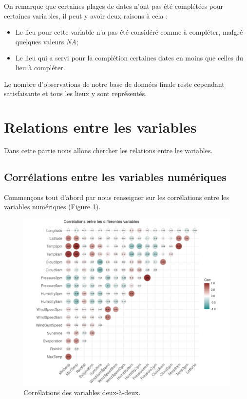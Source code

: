 \documentclass{article}
\begin{document}
On remarque que certaines plages de dates n'ont pas été complétées pour certaines variables, il peut y avoir deux raisons à cela : 
\begin{itemize}
    \item Le lieu pour cette variable n'a pas été considéré comme à compléter, malgré quelques valeurs \emph{NA};
    \item Le lieu qui a servi pour la complétion certaines dates en moins que celles du lieu à compléter.
\end{itemize}
Le nombre d'observations de notre base de données finale reste cependant satisfaisante et tous les lieux y sont représentés.

\section{Relations entre les variables}

Dans cette partie nous allons chercher les relations entre les variables.

\subsection{Corrélations entre les variables numériques}

Commençons tout d'abord par nous renseigner sur les corrélations entre les variables numériques (Figure \ref{fig:correlations}). 

\begin{figure}[htp]
    \centering
    \includegraphics[width=\textwidth]{Images/correlations_variables.png}
    \caption{Corrélations des variables deux-à-deux.}
    \label{fig:correlations}
\end{figure}
\end{document}

